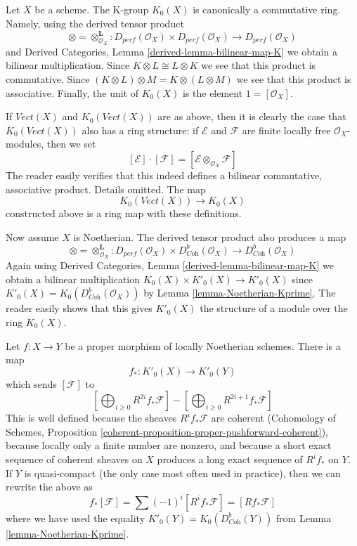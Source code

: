 \begin{remark}
\label{remark-K-ring}
Let $X$ be a scheme. The K-group $K_0(X)$ is canonically a commutative ring.
Namely, using the derived tensor product
$$
\otimes = \otimes^\mathbf{L}_{\mathcal{O}_X} :
D_{perf}(\mathcal{O}_X) \times D_{perf}(\mathcal{O}_X)
\longrightarrow
D_{perf}(\mathcal{O}_X)
$$
and Derived Categories, Lemma \ref{derived-lemma-bilinear-map-K}
we obtain a bilinear multiplication. Since $K \otimes L \cong L \otimes K$
we see that this product is commutative. Since
$(K \otimes L) \otimes M = K \otimes (L \otimes M)$
we see that this product is associative.
Finally, the unit of $K_0(X)$ is the element $1 = [\mathcal{O}_X]$.

\medskip\noindent
If $\textit{Vect}(X)$ and $K_0(\textit{Vect}(X))$ are as above, then
it is clearly the case that $K_0(\textit{Vect}(X))$ also has a
ring structure: if $\mathcal{E}$ and $\mathcal{F}$ are finite locally free
$\mathcal{O}_X$-modules, then we set
$$
[\mathcal{E}] \cdot [\mathcal{F}] =
[\mathcal{E} \otimes_{\mathcal{O}_X} \mathcal{F}]
$$
The reader easily verifies that this indeed defines a bilinear
commutative, associative product. Details omitted. The map
$$
K_0(\textit{Vect}(X)) \longrightarrow K_0(X)
$$
constructed above is a ring map with these definitions.

\medskip\noindent
Now assume $X$ is Noetherian. The derived tensor product also produces
a map
$$
\otimes = \otimes^\mathbf{L}_{\mathcal{O}_X} :
D_{perf}(\mathcal{O}_X) \times D^b_{\textit{Coh}}(\mathcal{O}_X)
\longrightarrow
D^b_{\textit{Coh}}(\mathcal{O}_X)
$$
Again using Derived Categories, Lemma \ref{derived-lemma-bilinear-map-K}
we obtain a bilinear multiplication $K_0(X) \times K'_0(X) \to K'_0(X)$
since $K'_0(X) = K_0(D^b_{\textit{Coh}}(\mathcal{O}_X))$ by
Lemma \ref{lemma-Noetherian-Kprime}.
The reader easily shows that this gives $K'_0(X)$ the structure
of a module over the ring $K_0(X)$.
\end{remark}

\begin{remark}
\label{remark-pushforward-K}
Let $f : X \to Y$ be a proper morphism of locally Noetherian schemes.
There is a map
$$
f_* : K'_0(X) \longrightarrow K'_0(Y)
$$
which sends $[\mathcal{F}]$ to
$$
[\bigoplus\nolimits_{i \geq 0} R^{2i}f_*\mathcal{F}] -
[\bigoplus\nolimits_{i \geq 0} R^{2i + 1}f_*\mathcal{F}]
$$
This is well defined because the sheaves $R^if_*\mathcal{F}$
are coherent (Cohomology of Schemes, Proposition
\ref{coherent-proposition-proper-pushforward-coherent}), because locally
only a finite number are nonzero, and because
a short exact sequence of coherent sheaves on $X$ produces a long
exact sequence of $R^if_*$ on $Y$. If $Y$ is quasi-compact (the only
case most often used in practice), then we can rewrite the above as
$$
f_*[\mathcal{F}] = \sum (-1)^i[R^if_*\mathcal{F}] = [Rf_*\mathcal{F}]
$$
where we have used the equality $K'_0(Y) = K_0(D^b_{\textit{Coh}}(Y))$ from
Lemma \ref{lemma-Noetherian-Kprime}.
\end{remark}

